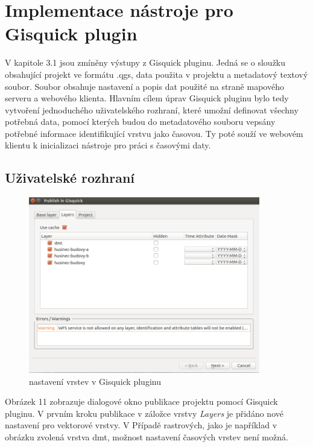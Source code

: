 \newpage
\section{Implementace nástroje pro Gisquick plugin}


V kapitole 3.1 jsou zmíněny výstupy z Gisquick pluginu. Jedná se o sloužku obsahující projekt ve formátu .qgs, data použita v projektu a metadatový textový soubor. Soubor obsahuje nastavení a popis dat použité na straně mapového serveru a webového klienta. Hlavním cílem úprav Gisquick pluginu bylo tedy vytvoření jednoduchého uživatelského rozhraní, které umožní definovat všechny potřebná data, pomocí kterých budou do metadatového souboru vepsány potřebné informace identifikující vrstvu jako časovou. Ty poté souží ve webovém klientu k inicializaci nástroje pro práci s časovými daty.

\subsection{Uživatelské rozhraní}

\begin{figure}[h!]
	\centering
	\includegraphics[width=0.9\textwidth]{../img/gisquick-plugin.png}
	\caption{nastavení vrstev v Gisquick pluginu}
	\label{fig:arcgis-time-settings}
\end{figure}

Obrázek 11 zobrazuje dialogové okno publikace projektu pomocí Gisquick pluginu. V prvním kroku publikace v záložce vrstvy \textit{Layers} je přidáno nové nastavení pro vektorové vrstvy. V Případě rastrových, jako je například v obrázku zvolená vrstva dmt, možnost nastavení časových vrstev není možná.


